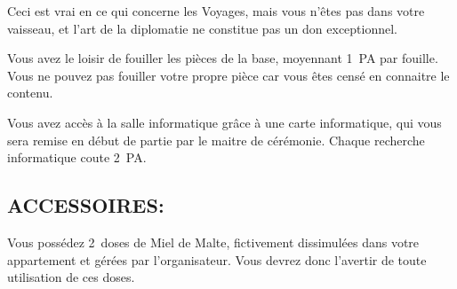 \documentclass[14pt,twocolumn]{extarticle}
\begin{document}
Ceci est vrai en ce qui concerne les Voyages, mais vous n'êtes pas dans votre
vaisseau, et l'art de la diplomatie ne constitue pas un don exceptionnel.

Vous avez le loisir de fouiller les pièces de la base, moyennant 1~PA par
fouille. Vous ne pouvez pas fouiller votre propre pièce car vous êtes censé en
connaitre le contenu.

Vous avez accès à la salle informatique grâce à une carte informatique, qui
vous sera remise en début de partie par le maitre de cérémonie. Chaque
recherche informatique coute 2~PA.

\subsection{ACCESSOIRES:}

Vous possédez 2~doses de Miel de Malte, fictivement dissimulées dans votre
appartement et gérées par l'organisateur. Vous devrez donc l'avertir de toute
utilisation de ces doses.
\end{document}

